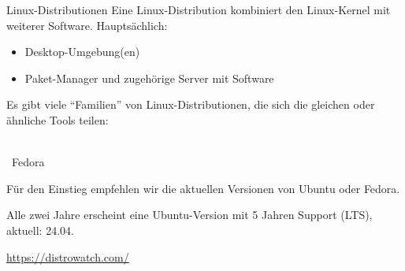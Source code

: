 \begin{frame}{Linux-Distributionen}
    Eine Linux-Distribution kombiniert den Linux-Kernel mit weiterer Software. Hauptsächlich:
    \begin{itemize}
        \item Desktop-Umgebung(en)
        \item Paket-Manager und zugehörige Server mit Software
    \end{itemize}

    Es gibt viele \enquote{Familien} von Linux-Distributionen, die sich die gleichen oder ähnliche Tools teilen:
    \begin{center}
        \hspace{0.5cm} \\[1\baselineskip]

        ~{\Huge Fedora}
        \hspace{0.5cm}
    \end{center}

    Für den Einstieg empfehlen wir die aktuellen Versionen von Ubuntu oder Fedora.

    Alle zwei Jahre erscheint eine Ubuntu-Version mit 5 Jahren Support (LTS), aktuell: 24.04.

    \url{https://distrowatch.com/} 
\end{frame}

